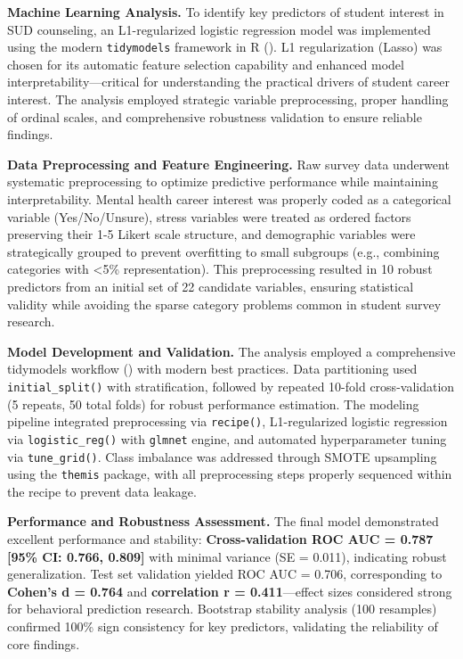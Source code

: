 \documentclass[
  man,
  longtable,
  nolmodern,
  notxfonts,
  notimes,
  colorlinks=true,linkcolor=blue,citecolor=blue,urlcolor=blue]{apa7}
\begin{document}
\textbf{Machine Learning Analysis.} To identify key predictors of
student interest in SUD counseling, an L1-regularized logistic
regression model was implemented using the modern \texttt{tidymodels}
framework in R ().
L1 regularization (Lasso) was chosen for its automatic feature selection
capability and enhanced model interpretability---critical for
understanding the practical drivers of student career interest. The
analysis employed strategic variable preprocessing, proper handling of
ordinal scales, and comprehensive robustness validation to ensure
reliable findings.

\textbf{Data Preprocessing and Feature Engineering.} Raw survey data
underwent systematic preprocessing to optimize predictive performance
while maintaining interpretability. Mental health career interest was
properly coded as a categorical variable (Yes/No/Unsure), stress
variables were treated as ordered factors preserving their 1-5 Likert
scale structure, and demographic variables were strategically grouped to
prevent overfitting to small subgroups (e.g., combining categories with
\textless5\% representation). This preprocessing resulted in 10 robust
predictors from an initial set of 22 candidate variables, ensuring
statistical validity while avoiding the sparse category problems common
in student survey research.

\textbf{Model Development and Validation.} The analysis employed a
comprehensive tidymodels workflow
() with modern
best practices. Data partitioning used \texttt{initial\_split()} with
stratification, followed by repeated 10-fold cross-validation (5
repeats, 50 total folds) for robust performance estimation. The modeling
pipeline integrated preprocessing via \texttt{recipe()}, L1-regularized
logistic regression via \texttt{logistic\_reg()} with \texttt{glmnet}
engine, and automated hyperparameter tuning via \texttt{tune\_grid()}.
Class imbalance was addressed through SMOTE upsampling using the
\texttt{themis} package, with all preprocessing steps properly sequenced
within the recipe to prevent data leakage.

\textbf{Performance and Robustness Assessment.} The final model
demonstrated excellent performance and stability:
\textbf{Cross-validation ROC AUC = 0.787 {[}95\% CI: 0.766, 0.809{]}}
with minimal variance (SE = 0.011), indicating robust generalization.
Test set validation yielded ROC AUC = 0.706, corresponding to
\textbf{Cohen's d = 0.764} and \textbf{correlation r = 0.411}---effect
sizes considered strong for behavioral prediction research. Bootstrap
stability analysis (100 resamples) confirmed 100\% sign consistency for
key predictors, validating the reliability of core findings.
\end{document}
